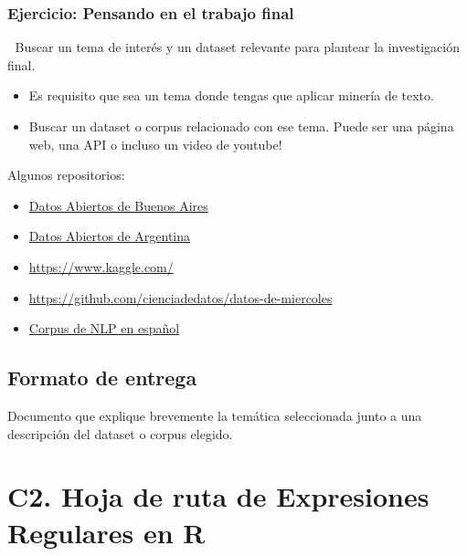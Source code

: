 \documentclass[
  letterpaper,
  DIV=11,
  numbers=noendperiod]{scrreprt}
\providecommand{\tightlist}{%
  \setlength{\itemsep}{0pt}\setlength{\parskip}{0pt}}
\begin{document}
\subsection{Ejercicio: Pensando en el trabajo
final}\label{ejercicio-pensando-en-el-trabajo-final}

📌 Buscar un tema de interés y un dataset relevante para plantear la
investigación final.

\begin{itemize}
\item
  Es requisito que sea un tema donde tengas que aplicar minería de
  texto.
\item
  Buscar un dataset o corpus relacionado con ese tema. Puede ser una
  página web, una API o incluso un video de youtube!
\end{itemize}

Algunos repositorios:

\begin{itemize}
\tightlist
\item
  \href{https://data.buenosaires.gob.ar/}{Datos Abiertos de Buenos
  Aires}
\end{itemize}

\begin{itemize}
\tightlist
\item
  \href{https://datos.gob.ar/}{Datos Abiertos de Argentina}
\end{itemize}

\begin{itemize}
\item
  \url{https://www.kaggle.com/}
\item
  \url{https://github.com/cienciadedatos/datos-de-miercoles}
\item
  \href{https://huggingface.co/collections/somosnlp/corpus-instructions-in-spanish-and-related-languages-6697e4ce5ef2828a1ff26d5d}{Corpus
  de NLP en español}
\end{itemize}

\section{Formato de entrega}\label{formato-de-entrega}

Documento que explique brevemente la temática seleccionada junto a una
descripción del dataset o corpus elegido.

\chapter{C2. Hoja de ruta de Expresiones Regulares en
R}\label{c2.-hoja-de-ruta-de-expresiones-regulares-en-r}
\end{document}
